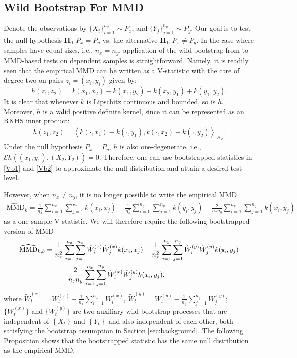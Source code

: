 \documentclass{article} %
\newcommand{\ev}{\mathcal{E}}
\newcommand{\Hk}{\ensuremath{\mathcal{H}_k}}%
\begin{document}
\subsection{Wild Bootstrap For MMD}
Denote the observations by $\{X_i\}_{i=1}^{n_x}\sim P_x$, and $\{Y_j\}_{j=1}^{n_y}\sim P_y$. Our goal is to test the null hypothesis $\mathbf H_0: P_x=P_y$ vs. 
the alternative $\mathbf H_1: P_x\neq P_y$. In the case where samples have equal sizes, i.e., $n_x=n_y$, application of the wild bootstrap from \cite{leucht_dependent_2013} to MMD-based tests on dependent samples is straightforward. Namely, it is readily seen that the empirical MMD can be written as a V-statistic with the core of degree two on pairs $z_i=(x_i,y_i)$ given by:
\[
h(z_1,z_2) = k(x_1,x_2)- k(x_1,y_2) - k(x_2,y_1) + k(y_1,y_2). 
\]
It is clear that whenever $k$ is Lipschitz continuous and bounded, so is $h$. Moreover, $h$ is a valid positive definite kernel, since it can be represented as an RKHS inner product: 
\begin{align*}
h(z_1,z_2) = \left\langle k(\cdot, x_1) -k(\cdot, y_1),k(\cdot, x_2) -k(\cdot, y_2) \right\rangle_{\Hk}. 
\end{align*}
Under the null hypothesis $P_x=P_y$, $h$ is also one-degenerate, i.e., $\ev h\left((x_1,y_1),(X_2,Y_2)\right) = 0$. Therefore, one can use bootstrapped statistics in \eqref{Vb1} and \eqref{Vb2} to approximate the null distribution and attain a desired test level.

However, when $n_x\neq n_y$, it is no longer possible to write the empirical MMD
\begin{align*}
\widehat{\text{MMD}}_k=\frac{1}{n_x^2}\sum_{i=1}^{n_x}\sum_{j=1}^{n_x}k(x_i,x_j)-\frac{1}{n_x^2}\sum_{i=1}^{n_y}\sum_{j=1}^{n_y}k(y_i,y_j)-\frac{2}{n_x n_y}\sum_{i=1}^{n_x}\sum_{j=1}^{n_y}k(x_i,y_j) 
\end{align*}
as a one-sample V-statistic. We will therefore require the following bootstrapped version of MMD
\begin{align}
\widehat{\text{MMD}}_{k,b}&=\frac{1}{n_x^2}\sum_{i=1}^{n_x}\sum_{j=1}^{n_x}\tilde W_i^{(x)}\tilde W_j^{(x)}k(x_i,x_j)-\frac{1}{n_x^2}\sum_{i=1}^{n_y}\sum_{j=1}^{n_y}\tilde W_i^{(y)}\tilde W_j^{(y)}k(y_i,y_j)\notag\\
{}&\qquad-\frac{2}{n_x n_y}\sum_{i=1}^{n_x}\sum_{j=1}^{n_y}\tilde W_i^{(x)}\tilde W_j^{(y)}k(x_i,y_j),\label{eq:mmdkb}
\end{align}
where $\tilde W_t^{(x)}=W_t^{(x)}-\frac{1}{n_x}\sum_{i=1}^{n_x}W_i^{(x)}$, $\tilde W_t^{(y)}=W_t^{(y)}-\frac{1}{n_y}\sum_{j=1}^{n_y}W_j^{(y)}$;  $\{W_t^{(x)}\}$ and $\{W_t^{(y)}\}$ are two auxiliary wild bootstrap processes that are independent of $\left\{ X_t \right\}$ and $\left\{ Y_t \right\}$ and also independent of each other, both satisfying the bootstrap assumption in Section \ref{sec:background}.  
The following Proposition shows that the bootstrapped statistic has the same null distribution as the empirical MMD.
\end{document}
